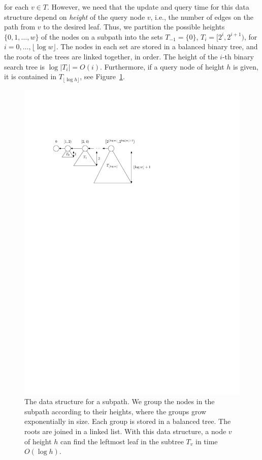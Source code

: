 \documentclass[a4paper,11pt]{article}
\newcommand{\?}{\mskip1.5mu}
\begin{document}
for each $v \in T$.
However, we need that the update and query time for this
data structure
depend on \emph{height} of the query node $v$, i.e., 
the number of edges on the path from
$v$ to the desired leaf.
Thus, we partition the possible heights
$\{0, 1, \dots, w\}$ of the nodes on a 
subpath into the sets
$T_{-1} = \{0\}$, $T_i =[2^i, 2^{i+1})$, for $i = 0,\dots,
\lfloor \log w  \rfloor$. 
The nodes in each set are stored in a balanced binary tree, and the 
roots of the trees are linked together, in order. 
The height of the $i$-th binary 
search tree is $\log |T_i| = O(i)$. Furthermore, if a query node
of height $h$ is given, 
it is contained in $T_{\lfloor \log h \rfloor}$, see 
Figure~\ref{fig:queryds}.
\begin{figure}
\centering
\includegraphics{queryds}
\caption{The data structure for a subpath. We group the nodes
in the subpath according to their heights, where the groups
grow exponentially in size. Each group is stored in a
balanced tree. The roots are joined in a linked
list. With this data structure, a node $v$ of height $h$ can
find the leftmost leaf in the subtree $T_v$ in time $O(\log h)$.}
\label{fig:queryds}
\end{figure}
\end{document}
